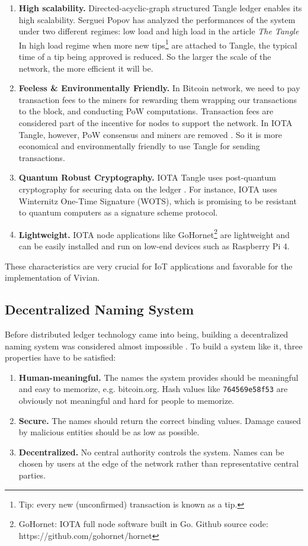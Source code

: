 \begin{enumerate}
    \item \textbf{High scalability.} Directed-acyclic-graph structured Tangle ledger enables its high scalability. Serguei Popov has analyzed the performances of the system under two different regimes: low load and high load in the article \textit{The Tangle} \cite{popov2015tangle} In high load regime when more new tips\footnote{Tip: every new (unconfirmed) transaction is known as a tip.} are attached to Tangle, the typical time of a tip being approved is reduced.
          So the larger the scale of the network, the more efficient it will be.
    \item \textbf{Feeless \& Environmentally Friendly.} In Bitcoin network, we need to pay transaction fees to the miners for rewarding them wrapping our transactions to the block, and conducting PoW computations. Transaction fees are considered part of the incentive for nodes to support the network. In IOTA Tangle, however, PoW consensus and miners are removed \cite{popov2019iota}. So it is more economical and environmentally friendly to use Tangle for sending transactions.
    \item \textbf{Quantum Robust Cryptography.} IOTA Tangle uses post-quantum cryptography for securing data on the ledger \cite{tennant2017improving}. For instance, IOTA uses Winternitz One-Time Signature (WOTS), which is promising to be resistant to quantum computers \cite{buchmann2008post} as a signature scheme protocol.
    \item \textbf{Lightweight.} IOTA node applications like GoHornet\footnote{GoHornet: IOTA full node software built in Go. Github source code: https://github.com/gohornet/hornet} are lightweight and can be easily installed and run on low-end devices such as Raspberry Pi 4.
\end{enumerate}

These characteristics are very crucial for IoT applications and favorable for the implementation of Vivian.


\subsection{Decentralized Naming System}
Before distributed ledger technology came into being, building a decentralized naming system was considered almost impossible \cite{swartz_2011}. To build a system like it, three properties have to be satisfied:

\begin{enumerate}
    \item \textbf{Human-meaningful.} The names the system provides should be meaningful and easy to memorize, e.g. bitcoin.org. Hash values like \texttt{764569e58f53} are obviously not meaningful and hard for people to memorize.
    \item \textbf{Secure.} The names should return the correct binding values. Damage caused by malicious entities should be as low as possible.
    \item \textbf{Decentralized.} No central authority controls the system. Names can be chosen by users at the edge of the network rather than representative central parties.
\end{enumerate}

